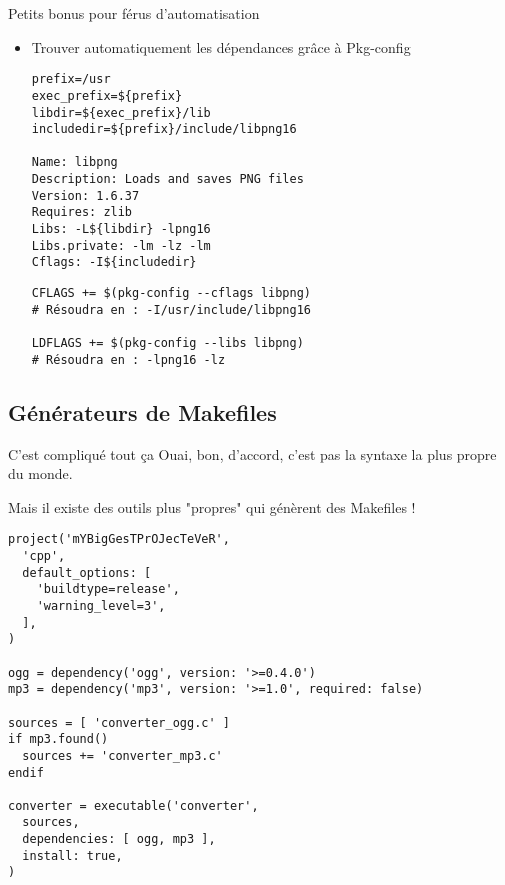 \begin{frame}[fragile]{Petits bonus pour férus d'automatisation}
\begin{itemize}
\item Trouver automatiquement les dépendances grâce à Pkg-config
\begin{lstlisting}[title=\texttt{/usr/lib/pkgconfig/libpng.pc}]
prefix=/usr
exec_prefix=${prefix}
libdir=${exec_prefix}/lib
includedir=${prefix}/include/libpng16

Name: libpng
Description: Loads and saves PNG files
Version: 1.6.37
Requires: zlib
Libs: -L${libdir} -lpng16
Libs.private: -lm -lz -lm 
Cflags: -I${includedir}
\end{lstlisting}

\begin{lstlisting}[title=Code du makefile]
CFLAGS += $(pkg-config --cflags libpng)
# Résoudra en : -I/usr/include/libpng16

LDFLAGS += $(pkg-config --libs libpng)
# Résoudra en : -lpng16 -lz
\end{lstlisting}
\end{itemize}
\end{frame}

\subsection{Générateurs de Makefiles}
\begin{frame}[fragile]{C'est compliqué tout ça\…}
Ouai, bon, d'accord, c'est pas la syntaxe la plus propre du monde.

\… Mais il existe des outils plus "propres" qui génèrent des Makefiles !
\begin{lstlisting}
project('mYBigGesTPrOJecTeVeR',
  'cpp',
  default_options: [
    'buildtype=release',
    'warning_level=3',
  ],
)

ogg = dependency('ogg', version: '>=0.4.0')
mp3 = dependency('mp3', version: '>=1.0', required: false)

sources = [ 'converter_ogg.c' ]
if mp3.found()
  sources += 'converter_mp3.c'
endif

converter = executable('converter',
  sources,
  dependencies: [ ogg, mp3 ],
  install: true,
)
  
\end{lstlisting}
\end{frame}

